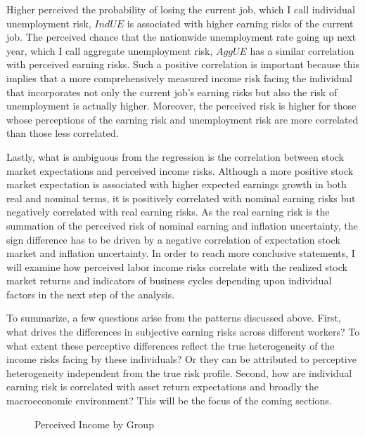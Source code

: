 \documentclass[12pt,notitlepage,onecolumn,aps,pra]{article}
\begin{document}
Higher perceived the probability of losing the current job, which I call
individual unemployment risk, \(\textit{IndUE}\) is associated with
higher earning risks of the current job. The perceived chance that the
nationwide unemployment rate going up next year, which I call aggregate
unemployment risk, \(\textit{AggUE}\) has a similar correlation with
perceived earning risks. Such a positive correlation is important
because this implies that a more comprehensively measured income risk
facing the individual that incorporates not only the current job's
earning risks but also the risk of unemployment is actually higher.
Moreover, the perceived risk is higher for those whose perceptions of
the earning risk and unemployment risk are more correlated than those
less correlated.

Lastly, what is ambiguous from the regression is the correlation between
stock market expectations and perceived income risks. Although a more
positive stock market expectation is associated with higher expected
earnings growth in both real and nominal terms, it is positively
correlated with nominal earning risks but negatively correlated with
real earning risks. As the real earning risk is the summation of the
perceived risk of nominal earning and inflation uncertainty, the sign
difference has to be driven by a negative correlation of expectation
stock market and inflation uncertainty. In order to reach more
conclusive statements, I will examine how perceived labor income risks
correlate with the realized stock market returns and indicators of
business cycles depending upon individual factors in the next step of
the analysis.

To summarize, a few questions arise from the patterns discussed above.
First, what drives the differences in subjective earning risks across
different workers? To what extent these perceptive differences reflect
the true heterogeneity of the income risks facing by these individuals?
Or they can be attributed to perceptive heterogeneity independent from
the true risk profile. Second, how are individual earning risk is
correlated with asset return expectations and broadly the macroeconomic
environment? This will be the focus of the coming sections.


    \begin{figure*}[!ht]
        \begin{center}\end{center}
        \caption{Perceived Income by Group}
        \label{fig:boxplotbygroup}
    \end{figure*}
    
\end{document}
